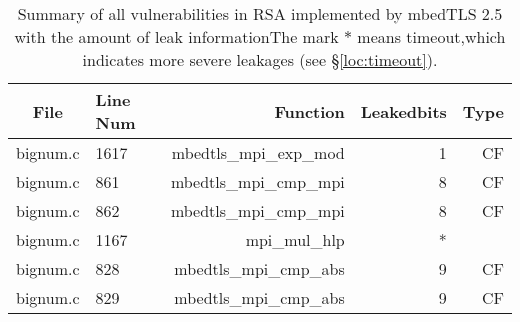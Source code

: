 \begin{table*}%
\centering
\caption{Summary of all vulnerabilities in RSA implemented by mbedTLS 2.5 with the amount of leak informationThe mark $*$ means timeout,which indicates more severe leakages (see \S\ref{loc:timeout}).}\label{tab:RSAmbedTLS}
\begin{tabular}{clrrr}
\hline
\textbf{File} & \textbf{Line Num} & \textbf{Function} & \textbf{Leakedbits} & \textbf{Type} \\\hline
bignum.c& 1617&mbedtls\_mpi\_exp\_mod&1 &CF\\
bignum.c& 861&mbedtls\_mpi\_cmp\_mpi&8 &CF\\
bignum.c& 862&mbedtls\_mpi\_cmp\_mpi&8 &CF\\
bignum.c& 1167&mpi\_mul\_hlp&*&\\
bignum.c& 828&mbedtls\_mpi\_cmp\_abs&9 &CF\\
bignum.c& 829&mbedtls\_mpi\_cmp\_abs&9 &CF\\
\hline
\end{tabular}
\end{table*}